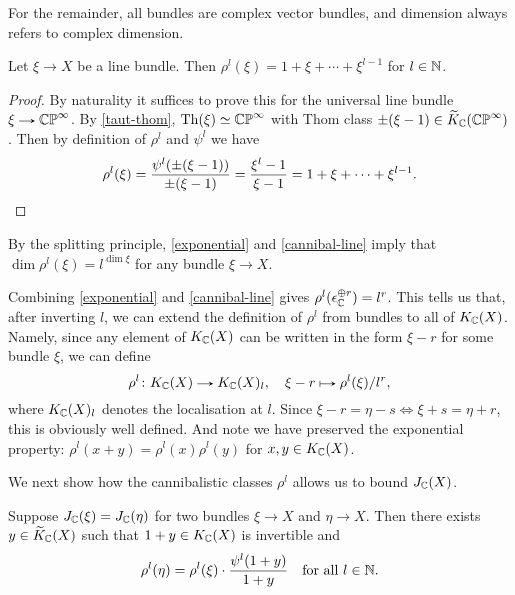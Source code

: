 \begin{convention}
  \label{complex-convention}
  For the remainder, all bundles are complex vector bundles, and
  dimension always refers to complex dimension.
\end{convention}

\begin{lemma}
  \label{cannibal-line}
  Let $\xi \to X$ be a line bundle. Then $\rho^l(\xi) = 1 + \xi +
  \cdots + \xi^{l-1}$ for $l \in \mathbb{N}$.
\end{lemma}

\begin{proof}
  By naturality it suffices to prove this for the universal line
  bundle $\xi \to \CP^{\infty}$. By \eqref{taut-thom}, $\operatorname{Th}(\xi) \simeq
  \mathbb{CP}^\infty$ with Thom class $\pm(\xi - 1) \in
  \widetilde K_{\mathbb{C}}(\mathbb{CP}^\infty)$. Then by definition of $\rho^l$ and $\psi^l$
  we have
  \[
  \rho^l(\xi) = \frac{\psi^l(\pm(\xi-1))}{\pm(\xi-1)} = \frac{\xi^l -
    1}{\xi - 1} = 1 + \xi + \cdots + \xi^{l-1}. \qedhere
  \]
\end{proof}

\begin{remark}
  \label{cannibal-dim}
  By the splitting principle, \eqref{exponential} and
  \eqref{cannibal-line} imply that $\dim \rho^l(\xi) = l^{\dim \xi}$
  for any bundle $\xi \to X$.
\end{remark}

\begin{nothing}
  \label{cannibal-extend}
  Combining \eqref{exponential} and \eqref{cannibal-line} gives
  $\rho^l(\epsilon_{\mathbb{C}}^{\oplus r}) = l^r$. This tells us that, after
  inverting $l$, we can extend the definition of $\rho^l$ from bundles
  to all of $K_{\mathbb{C}}(X)$. Namely, since any element of $K_{\mathbb{C}}(X)$ can be
  written in the form $\xi - r$ for some bundle $\xi$, we can define
  \[
  \rho^l \c K_\C(X) \to K_\C(X)_l, \quad \xi - r \mapsto
  \rho^l(\xi)/l^r,
  \]
  where $K_{\mathbb{C}}(X)_l$ denotes the localisation at $l$. Since $\xi - r =
  \eta - s \iff \xi + s = \eta + r$, this is obviously well
  defined. And note we have preserved the exponential property:
  $\rho^l(x+y) = \rho^l(x)\rho^l(y)$ for $x,y \in K_{\mathbb{C}}(X)$.
\end{nothing}

We next show how the cannibalistic classes $\rho^l$ allows us to bound
$J_{\mathbb{C}}(X)$.

\begin{lemma}
  \label{jprime-condition}
  Suppose $J_{\mathbb{C}}(\xi) = J_{\mathbb{C}}(\eta)$ for two bundles $\xi \to X$ and
  $\eta \to X$. Then there exists $y \in \widetilde K_{\mathbb{C}}(X)$ such that $1+y
  \in K_{\mathbb{C}}(X)$ is invertible and
  \[
  \rho^l(\eta) = \rho^l(\xi) \cdot \frac{\psi^l(1+y)}{1+y} \quad
  \text{for all } l \in \mathbb{N}.
  \]
\end{lemma}


